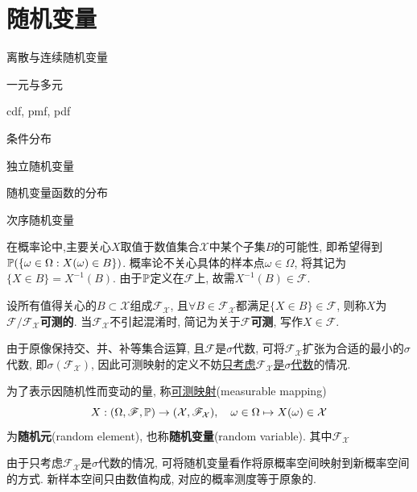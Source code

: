\documentclass[../main]{subfiles}
\begin{document}
\chapter{随机变量}

\begin{introduction}
    \item 离散与连续随机变量
    \item 一元与多元
    \item cdf, pmf, pdf
    \item 条件分布
    \item 独立随机变量
    \item 随机变量函数的分布
    \item 次序随机变量
\end{introduction}

在概率论中,主要关心$X$取值于数值集合$\mathcal{X}$中某个子集$B$的可能性, 即希望得到$\P(\{\omega\in\Omega : X(\omega) \in B\})$. 概率论不关心具体的样本点$\omega\in\Omega$, 将其记为$\{X \in B\} = X^{-1}(B)$. 由于$\P$定义在$\mathscr{F}$上, 故需$X^{-1}(B) \in \mathscr{F}$.

\begin{definition}[可测性]
    设所有值得关心的$B\subset \mathcal{X}$组成$\mathscr{F}_{\mathcal{X}}$, 且$\forall B \in \mathscr{F}_{\mathcal{X}}$都满足$\{X\in B\} \in \mathscr{F}$, 则称$X$为$\mathscr{F}/\mathscr{F}_{\mathcal{X}}$\textbf{可测的}. 当$\mathscr{F}_{\mathcal{X}}$不引起混淆时, 简记为关于$\mathscr{F}$\textbf{可测}, 写作$X \in \mathscr{F}$.
\end{definition}

由于原像保持交、并、补等集合运算, 且$\mathscr{F}$是$\sigma$代数, 可将$\mathscr{F}_{\mathcal{X}}$扩张为合适的最小的$\sigma$代数, 即$\sigma(\mathscr{F}_{\mathcal{X}})$, 因此可测映射的定义不妨\underline{只考虑$\mathscr{F}_{\mathcal{X}}$是$\sigma$代数}的情况.



\begin{definition}[随机变量]
    为了表示因随机性而变动的量, 称\underline{可测映射}(measurable mapping)
    \[ X : (\Omega,\mathscr{F},\P) \to (\mathcal{X},\mathscr{F}_{\mathcal{X}}), \quad \omega\in\Omega \mapsto X(\omega)\in\mathcal{X} \]
    为\textbf{随机元}(random element), 也称\textbf{随机变量}(random variable). 其中$\mathscr{F}_{\mathcal{X}}$
\end{definition}

由于只考虑$\mathscr{F}_{\mathcal{X}}$是$\sigma$代数的情况, 可将随机变量看作将原概率空间映射到新概率空间的方式. 新样本空间只由数值构成, 对应的概率测度等于原象的.
\end{document}
